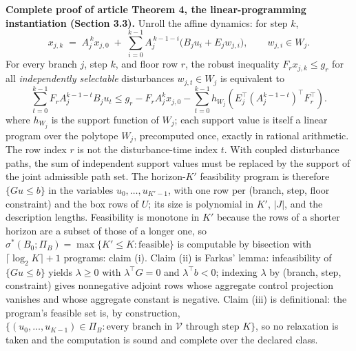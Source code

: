 \documentclass[11pt]{article}
\theoremstyle{definition}
\begin{document}
\bigskip
\noindent\textbf{Complete proof of article Theorem 4, the linear-programming instantiation (Section 3.3).} Unroll the affine dynamics: for step \(k\),
\[
x_{j,k} \;=\; A_{j}^{\,k} x_{j,0} \;+\; \sum_{i=0}^{k-1} A_{j}^{\,k-1-i}\bigl(B_{j} u_{i} + E_{j} w_{j,i}\bigr),
\qquad w_{j,i} \in W_{j}.
\]
For every branch \(j\), step \(k\), and floor row \(r\), the robust inequality \(F_r x_{j,k}\le g_r\) for all \emph{independently selectable} disturbances \(w_{j,t}\in W_j\) is equivalent to
\[\sum_{t=0}^{k-1}F_r A_j^{k-1-t}B_j u_t
\le g_r-F_r A_j^k x_{j,0}-\sum_{t=0}^{k-1}h_{W_j}\!\left(E_j^{\top}(A_j^{k-1-t})^{\top}F_r^{\top}\right).\]
where \(h_{W_{j}}\) is the support function of \(W_{j}\); each support value is itself a
linear program over the polytope \(W_{j}\), precomputed once, exactly in rational
arithmetic. The row index \(r\) is not the disturbance-time index \(t\). With coupled disturbance paths, the sum of independent support values must be replaced by the support of the joint admissible path set. The horizon-\(K'\) feasibility program is therefore
\(\{G u \le b\}\) in the variables \(u_{0},\dots,u_{K'-1}\), with one row per (branch, step,
floor constraint) and the box rows of \(U\); its size is polynomial in \(K'\), \(|J|\), and
the description lengths. Feasibility is monotone in \(K'\) because the rows of a shorter
horizon are a subset of those of a longer one, so \(\sigma^{*}(B_{0};\Pi_{B}) = \max\{K'
\le K : \text{feasible}\}\) is computable by bisection with \(\lceil \log_{2} K \rceil + 1\)
programs: claim (i). Claim (ii) is Farkas' lemma: infeasibility of \(\{Gu \le b\}\) yields
\(\lambda \ge 0\) with \(\lambda^{\top} G = 0\) and \(\lambda^{\top} b < 0\); indexing
\(\lambda\) by (branch, step, constraint) gives nonnegative adjoint rows whose aggregate
control projection vanishes and whose aggregate constant is negative. Claim (iii) is
definitional: the program's feasible set is, by construction,
\(\{(u_{0},\dots,u_{K-1}) \in \Pi_{B} : \text{every branch in } \mathcal{V} \text{ through
step } K\}\), so no relaxation is taken and the computation is sound and complete over the
declared class.
\end{document}
